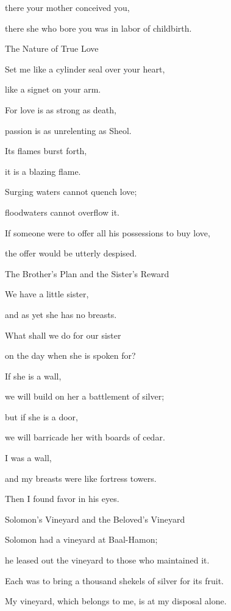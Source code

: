{\par }{\Q there
your mother
conceived
you,
\par }{\Q there
she who bore you was in labor
of childbirth.
\par }{\SH The Nature of True Love
\par }{\SH 
{}
\par }{\Q {}Set
me like a cylinder seal
over
your heart,
\par }{\Q like a signet
on
your arm.
\par }{\Q For
love
is as strong
as death,
\par }{\Q passion
is as unrelenting
as Sheol.
\par }{\Q Its flames burst forth,
\par }{\Q it is a blazing
flame.
\par }{\Q {}Surging
waters
cannot
quench
love;
\par }{\Q floodwaters
cannot
overflow
it.
\par }{\Q If
someone
were to offer
all
his possessions
to buy love,
\par }{\Q the offer would be utterly
despised.
\par }{\SH The Brother’s Plan and the Sister’s Reward
\par }{\SH 
{}
\par }{\Q {}We have a little
sister,
\par }{\Q and as yet she has no
breasts.
\par }{\Q What
shall we do
for our sister
\par }{\Q on the day
when she is spoken for?
\par }{\Q {}If
she is
a wall,
\par }{\Q we will build
on
her a battlement
of silver;
\par }{\Q but if
she is a door,
\par }{\Q we will barricade
her with boards
of cedar.
\par }{\SH 
{}
\par }{\Q {}I
was a wall,
\par }{\Q and my breasts
were like fortress towers.
\par }{\Q Then
I found
favor
in his eyes.
\par }{\SH Solomon’s Vineyard and the Beloved’s Vineyard
\par }{\SH 
{}
\par }{\Q {}Solomon
had
a vineyard
at Baal-Hamon;
\par }{\Q he leased
out the
vineyard
to those who maintained
it.
\par }{\Q Each
was to bring
a thousand
shekels
of silver
for its fruit.
\par }{\Q {}My vineyard,
which belongs to me, is at my disposal
alone.

}
